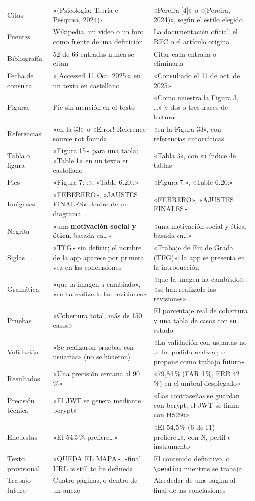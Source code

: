 \documentclass[11pt,a4paper]{article}
\newcommand{\cmd}[1]{\texttt{\textbackslash #1}}
\begin{document}
{\begin{longtable}{@{}p{3.0cm}p{5.8cm}p{5.8cm}@{}}
  Citas & «(Psicología: Teoría e Pesquisa, 2024)» & «Pereira [4]» o «(Pereira, 2024)», según el estilo elegido \\
  Fuentes & Wikipedia, un vídeo o un foro como fuente de una definición & La documentación oficial, el RFC o el artículo original \\
  Bibliografía & 52 de 66 entradas nunca se citan & Citar cada entrada o eliminarla \\
  Fecha de consulta & «[Accessed 11 Oct. 2025]» en un texto en castellano & «Consultado el 11 de oct. de 2025» \\
  Figuras & Pie sin mención en el texto & «Como muestra la Figura 3, \ldots» y dos o tres frases de lectura \\
  Referencias & «en la 33» o «Error! Reference source not found» & «en la Figura 33», con referencias automáticas \\
  Tabla o figura & «Figura 15» para una tabla; «Table 1» en un texto en castellano & «Tabla 3», con su índice de tablas \\
  Pies & «Figura 7: :», «Table 6.20.:» & «Figura 7:», «Table 6.20:» \\
  Imágenes & «FEBERERO», «JAUSTES FINALES» dentro de un diagrama & «FEBRERO», «AJUSTES FINALES» \\
  Negrita & «una \textbf{motivación social y ética}, basada en\ldots» & «una motivación social y ética, basada en\ldots» \\
  Siglas & «TFG» sin definir; el nombre de la app aparece por primera vez en las conclusiones & «Trabajo de Fin de Grado (TFG)»; la app se presenta en la introducción \\
  Gramática & «que la imagen a cambiado», «se ha realizado las revisiones» & «que la imagen ha cambiado», «se han realizado las revisiones» \\
  Pruebas & «Cobertura total, más de 150 casos» & El porcentaje real de cobertura y una tabla de casos con su estado \\
  Validación & «Se realizaron pruebas con usuarias» (no se hicieron) & «La validación con usuarias no se ha podido realizar; se propone como trabajo futuro» \\
  Resultados & «Una precisión cercana al 90\,\%» & «79,84\,\% (FAR 1\,\%, FRR 42\,\%) en el umbral desplegado» \\
  Precisión técnica & «El JWT se genera mediante bcrypt» & «Las contraseñas se guardan con bcrypt; el JWT se firma con HS256» \\
  Encuestas & «El 54,5\,\% prefiere\ldots» & «El 54,5\,\% (6 de 11) prefiere\ldots», con N, perfil e instrumento \\
  Texto provisional & «QUEDA EL MAPA», «final URL is still to be defined» & El contenido definitivo, o \cmd{pending} mientras se trabaja \\
  Trabajo futuro & Cuatro páginas, o dentro de un anexo & Alrededor de una página al final de las conclusiones \\
\end{longtable}}
\end{document}
